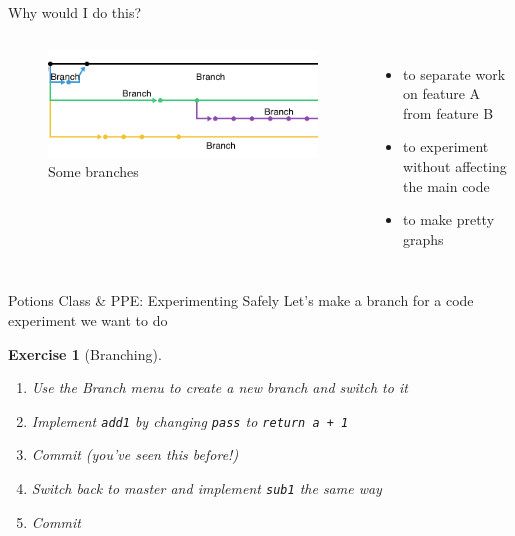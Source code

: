 \documentclass{beamer}
\theoremstyle{example}
\newtheorem{exercise}{Exercise}
\begin{document}
\begin{frame}{Why would I do this?}
    \begin{columns}
        \begin{figure}
            \includegraphics[scale=0.4]{img/branches}
            \caption{Some branches}
        \end{figure}

        \begin{itemize}
            \item to separate work on feature A from feature B
            \item to experiment without affecting the main code
            \item to make pretty graphs
        \end{itemize}
    \end{columns}
\end{frame}

\begin{frame}{Potions Class \& PPE\@: Experimenting Safely}
    Let's make a branch for a code experiment we want to do
    \begin{exercise}[Branching]
        \begin{enumerate}
            \item Use the Branch menu to create a new branch and switch to it
            \item Implement \texttt{add1} by changing \texttt{pass} to
                \texttt{return a + 1}
            \item Commit (you've seen this before!)
            \item Switch back to master and implement \texttt{sub1} the same way
            \item Commit
        \end{enumerate}
    \end{exercise}
\end{frame}
\end{document}
